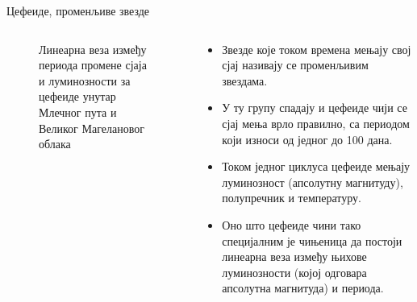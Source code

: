 \documentclass[aspectratio=169, xcolor=table, 10pt]{beamer}
\theoremstyle{definition}
\begin{document}
\begin{frame}{Цефеиде, променљиве звезде}
  \begin{columns}[T]
    \begin{column}{0.5\textwidth}
      \begin{figure}
        \centering
        \captionsetup{width=\wd0}
        \caption{Линеарна веза између периода промене сјаја и луминозности за цефеиде унутар Млечног пута и Великог Магелановог облака}
      \end{figure}
    \end{column}
    \begin{column}{0.5\textwidth}
      \begin{itemize}
        \item Звезде које током времена мењају свој сјај називају се променљивим звездама.
        \item У ту групу спадају и цефеиде чији се сјај мења врло правилно, са периодом који износи од једног до 100 дана.
        \item Током једног циклуса цефеиде мењају луминозност (апсолутну магнитуду), полупречник и температуру.
        \item Оно што цефеиде чини тако специјалним је чињеница да постоји линеарна веза између њихове луминозности (којој одговара апсолутна магнитуда) и периода.
      \end{itemize}
    \end{column}
  \end{columns}
\end{frame}
\end{document}
